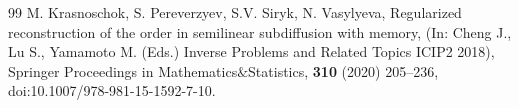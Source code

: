 \documentclass[10pt,a4paper]{amsart}
\begin{document}
\begin{thebibliography}{99}
 M. Krasnoschok, S. Pereverzyev, S.V. Siryk, N. Vasylyeva, Regularized reconstruction of the order in semilinear subdiffusion with memory, (In: Cheng J., Lu S., Yamamoto M. (Eds.) Inverse Problems and Related Topics ICIP2 2018), Springer Proceedings in Mathematics$\&$Statistics, \textbf{310} (2020) 205--236, doi:10.1007/978-981-15-1592-7-10.
\end{thebibliography}
\end{document}
